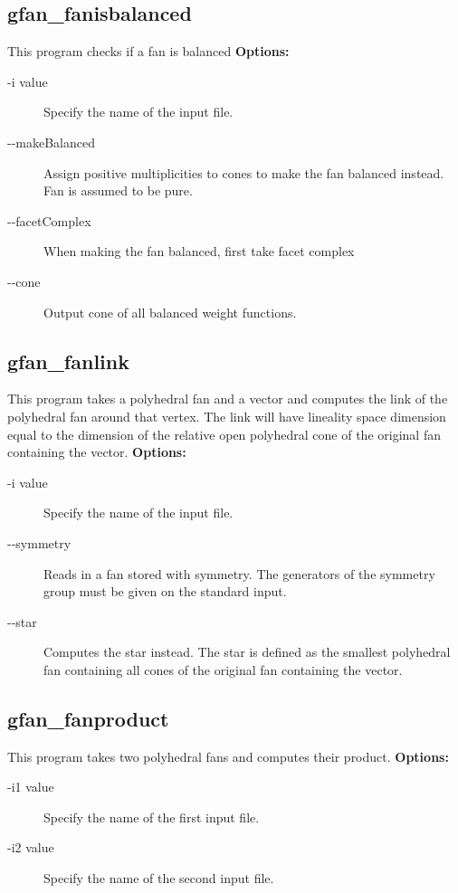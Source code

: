 {{{{{{{\subsection{gfan\_fanisbalanced}\label{applist:_fanisbalanced}
This program checks if a fan is balanced
\newline
{\bf Options:}
\begin{description}
\item[-i value]Specify the name of the input file.\item[-\hspace{0.013cm}-makeBalanced]Assign positive multiplicities to cones to make the fan balanced instead. Fan is assumed to be pure.\item[-\hspace{0.013cm}-facetComplex]When making the fan balanced, first take facet complex\item[-\hspace{0.013cm}-cone]Output cone of all balanced weight functions.\end{description}


{\subsection{gfan\_fanlink}\label{applist:_fanlink}
This program takes a polyhedral fan and a vector and computes the link of the polyhedral fan around that vertex. The link will have lineality space dimension equal to the dimension of the relative open polyhedral cone of the original fan containing the vector.
\newline
{\bf Options:}
\begin{description}
\item[-i value]Specify the name of the input file.\item[-\hspace{0.013cm}-symmetry]Reads in a fan stored with symmetry. The generators of the symmetry group must be given on the standard input.
\item[-\hspace{0.013cm}-star]Computes the star instead. The star is defined as the smallest polyhedral fan containing all cones of the original fan containing the vector.\end{description}


{\subsection{gfan\_fanproduct}\label{applist:_fanproduct}
This program takes two polyhedral fans and computes their product.
\newline
{\bf Options:}
\begin{description}
\item[-i1 value]Specify the name of the first input file.\item[-i2 value]Specify the name of the second input file.\end{description}


}}}}}}}}}
